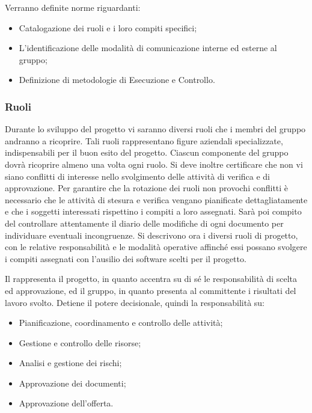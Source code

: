 \documentclass[12pt,a4paper]{article}
\begin{document}
Verranno definite norme riguardanti:
\begin{itemize}
  \item Catalogazione dei ruoli e i loro compiti specifici;
  \item L'identificazione delle modalità di comunicazione interne ed esterne al gruppo;
  \item Definizione di metodologie di Esecuzione e Controllo.
\end{itemize}

\subsubsection{Ruoli}\label{Ruoli}

Durante lo sviluppo del progetto vi saranno diversi ruoli che i membri del gruppo andranno a ricoprire. Tali ruoli rappresentano figure aziendali specializzate, indispensabili per il buon esito del progetto. Ciascun componente del gruppo dovrà ricoprire almeno una volta ogni ruolo. Si deve inoltre certificare che non vi siano conflitti di interesse nello svolgimento delle attività di verifica e di approvazione.
Per garantire che la rotazione dei ruoli non provochi conflitti è necessario che le attività di stesura e verifica vengano pianificate dettagliatamente e che i soggetti interessati rispettino i compiti a loro assegnati. Sarà poi compito del \VR{} controllare attentamente il diario delle modifiche di ogni documento per individuare eventuali incongruenze.
Si descrivono ora i diversi ruoli di progetto, con le relative responsabilità e le modalità operative affinché essi possano svolgere i compiti assegnati con l'ausilio dei software scelti per il progetto.

Il \PM{} rappresenta il progetto, in quanto accentra su di sé le responsabilità di scelta ed approvazione, ed il gruppo, in quanto presenta al committente i risultati del lavoro svolto.
Detiene il potere decisionale, quindi la responsabilità su:
\begin{itemize}
  \item Pianificazione, coordinamento e controllo delle attività;
  \item Gestione e controllo delle risorse;
  \item Analisi e gestione dei rischi;
  \item Approvazione dei documenti;
  \item Approvazione dell'offerta.
\end{itemize}
\end{document}

